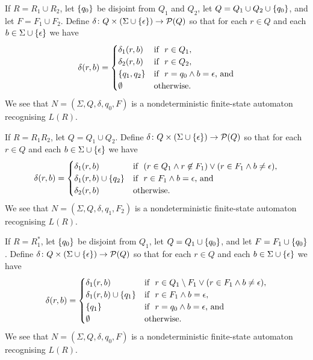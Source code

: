     If \(R = R_1 \cup R_2\), let \(\{q_0\}\) be disjoint from \(Q_1\) and
    \(Q_2\), let \(Q = Q_1 \cup Q_2 \cup \{q_0\}\), and let \(F = F_1 \cup
    F_2\). Define \(\delta\colon Q \times (\Sigma \cup
    \{\epsilon\})\to\mathcal{P}(Q)\) so that for each \(r \in Q\) and each \(b \in
    \Sigma \cup \{\epsilon\}\) we have
    \[
        \delta(r, b) = \begin{cases}
            \delta_1(r, b) & \text{if }\ r \in Q_1,\\
            \delta_2(r, b) & \text{if }\ r \in Q_2,\\
            \{q_1, q_2\} & \text{if }\ r = q_0 \land b = \epsilon \text{,
            and}\\
            \emptyset & \text{otherwise.}
        \end{cases}
    \]
    We see that \(N = (\Sigma, Q, \delta, q_0, F)\) is a nondeterministic
    finite-state automaton recognising \(L(R)\).

    If \(R = R_1 R_2\), let \(Q = Q_1 \cup Q_2\). Define \(\delta\colon Q \times
    (\Sigma \cup \{\epsilon\})\to\mathcal{P}(Q)\) so that for each \(r \in Q\) and
    each \(b \in \Sigma \cup \{\epsilon\}\) we have
    \[
        \delta(r, b) = \begin{cases}
            \delta_1(r, b) & \text{if }\ (r \in Q_1 \land r \not\in F_1) \lor (r
            \in F_1 \land b \neq \epsilon),\\
            \delta_1(r, b) \cup \{q_2\} & \text{if }\ r \in F_1 \land b =
            \epsilon \text{, and}\\
            \delta_2(r, b) & \text{otherwise.}
        \end{cases}
    \]
    We see that \(N = (\Sigma, Q, \delta, q_1, F_2)\) is a nondeterministic
    finite-state automaton recognising \(L(R)\).

    If \(R = R_1^*\), let \(\{q_0\}\) be disjoint from \(Q_1\), let \(Q = Q_1
    \cup \{q_0\}\), and let \(F = F_1 \cup \{q_0\}\). Define
    \(\delta\colon Q \times (\Sigma \cup \{\epsilon\})\to\mathcal{P}(Q)\) so that for
    each \(r \in Q\) and each \(b \in \Sigma \cup \{\epsilon\}\) we have
    \[
        \delta(r, b) = \begin{cases}
            \delta_1(r, b) & \text{if }\ r \in Q_1 \setminus F_1 \lor (r \in F_1
            \land b \neq \epsilon),\\
            \delta_1(r, b) \cup \{q_1\} & \text{if }\ r \in F_1 \land b =
            \epsilon,\\
            \{q_1\} & \text{if }\ r = q_0 \land b = \epsilon \text{, and}\\
            \emptyset & \text{otherwise.}
        \end{cases}
    \]
    We see that \(N = (\Sigma, Q, \delta, q_0, F)\) is a nondeterministic
    finite-state automaton recognising \(L(R)\).

